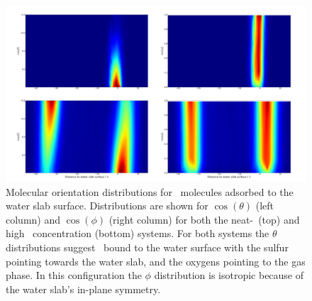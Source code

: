 \begin{figure}[h!]
	\begin{center}
		\includegraphics[scale=1.0]{images/so2orientationsmall.png}
		\caption{Molecular orientation distributions for \suldiox~molecules adsorbed to the water slab surface. Distributions are shown for $\cos(\theta)$ (left column) and $\cos(\phi)$ (right column) for both the neat-\wat~(top) and high \suldiox~concentration (bottom) systems. For both systems the $\theta$ distributions suggest \suldiox~bound to the water surface with the sulfur pointing towards the water slab, and the oxygens pointing to the gas phase. In this configuration the $\phi$ distribution is isotropic because of the water slab's in-plane symmetry.}
		\label{fig:so2-orientation}
	\end{center}
\end{figure}
